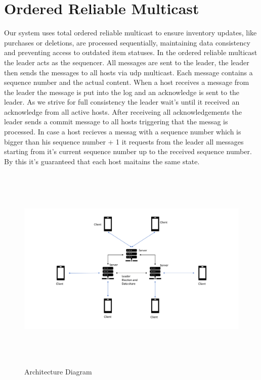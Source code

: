 \section{Ordered Reliable Multicast}\label{sec:OrderedReliableMulticast}
Our system uses total ordered reliable multicast to ensure inventory updates, like purchases or deletions, are processed sequentially, maintaining data consistency and preventing access to outdated item statuses. In the ordered reliable multicast the leader acts as the sequencer. All messages are sent to the leader, the leader then sends the messages to all hosts via udp multicast. Each message contains a sequence number and the actual content. When a host receives a message from the leader the message is put into the log and an acknowledge is sent to the leader. As we strive for full consistency the leader wait's until it received an acknowledge from all active hosts. After receiveing all acknowledgements the leader sends a commit message to all hosts triggering that the messag is processed. In case a host recieves a messag with a sequence number which is bigger than his sequence number + 1 it requests from the leader all messages starting from it's current sequence number up to the received sequence number. By this it's guaranteed that each host maitains the same state. 




\begin{figure}[h!]
        \includegraphics[height=10cm, width=18cm]{images/Architecture.png}
        \caption{Architecture Diagram}
        \label{fig:architecture}
\end{figure}
